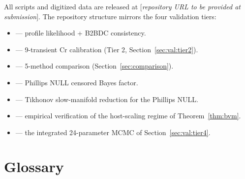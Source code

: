\documentclass[12pt]{article}
\theoremstyle{plain}
\theoremstyle{definition}
\theoremstyle{remark}
\begin{document}
All scripts and digitized data are released at
[\textit{repository URL to be provided at submission}].  The repository
structure mirrors the four validation tiers:
%
\begin{sloppypar}
\begin{itemize}
\item {} --- profile likelihood +
B2BDC consistency.
\item {} --- 9-transient Cr
calibration (Tier 2, Section~\ref{sec:val:tier2}).
\item {} --- 5-method comparison
(Section~\ref{sec:comparison}).
\item {} --- Phillips NULL censored
Bayes factor.
\item {} --- Tikhonov slow-manifold
reduction for the Phillips NULL.
\item {} --- empirical
verification of the host-scaling regime of Theorem~\ref{thm:bvm}.
\item {} --- the integrated
24-parameter MCMC of Section~\ref{sec:val:tier4}.
\end{itemize}
\end{sloppypar}

\section{Glossary}\label{app:glossary}
\end{document}
